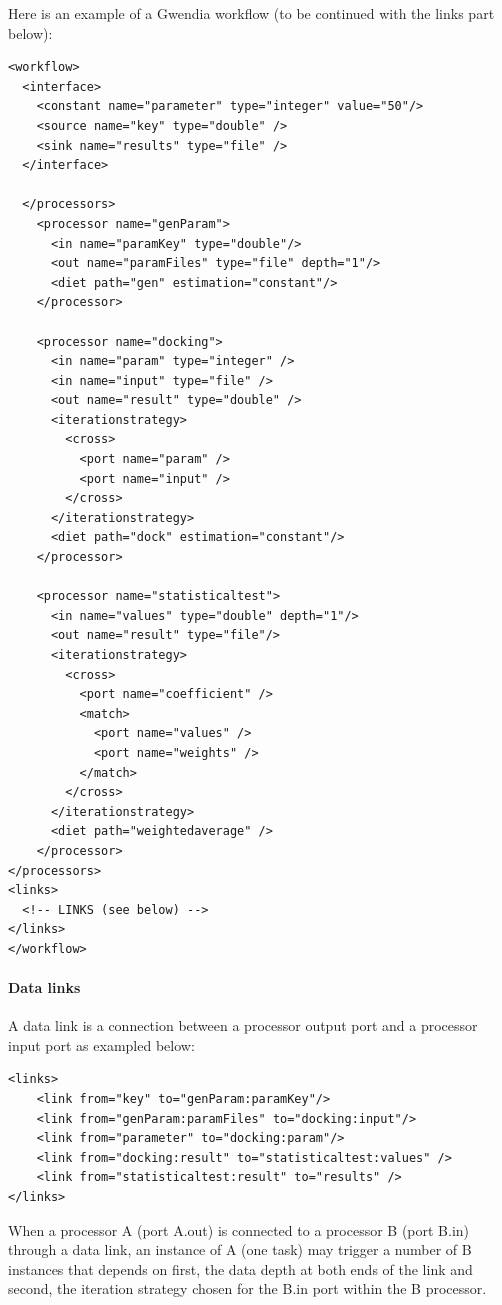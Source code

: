 Here is an example of a Gwendia workflow (to be continued with the links part
below):

\begin{verbatim}
<workflow>
  <interface>
    <constant name="parameter" type="integer" value="50"/>
    <source name="key" type="double" />
    <sink name="results" type="file" />
  </interface>

  </processors>
    <processor name="genParam">
      <in name="paramKey" type="double"/>
      <out name="paramFiles" type="file" depth="1"/>
      <diet path="gen" estimation="constant"/>
    </processor>

    <processor name="docking">
      <in name="param" type="integer" />
      <in name="input" type="file" />
      <out name="result" type="double" />
      <iterationstrategy>
        <cross>
          <port name="param" />
          <port name="input" />
        </cross>
      </iterationstrategy>
      <diet path="dock" estimation="constant"/>
    </processor>

    <processor name="statisticaltest">
      <in name="values" type="double" depth="1"/>
      <out name="result" type="file"/>
      <iterationstrategy>
        <cross>
          <port name="coefficient" />
          <match>
            <port name="values" />
            <port name="weights" />
          </match>
        </cross>
      </iterationstrategy>
      <diet path="weightedaverage" />
    </processor>
</processors>
<links>
  <!-- LINKS (see below) -->
</links>
</workflow>
\end{verbatim}

\paragraph{Data links} A data link is a connection between a processor output port and a processor input port as exampled below:
\begin{verbatim}
<links>
    <link from="key" to="genParam:paramKey"/>
    <link from="genParam:paramFiles" to="docking:input"/>
    <link from="parameter" to="docking:param"/>
    <link from="docking:result" to="statisticaltest:values" />
    <link from="statisticaltest:result" to="results" />
</links>
\end{verbatim}
When a processor A (port A.out) is connected to a processor B (port B.in)
through a data link, an instance of A (one task) may trigger a number of B
instances that depends on first, the data depth at both ends of the link and
second, the iteration strategy chosen for the B.in port within the B processor.


